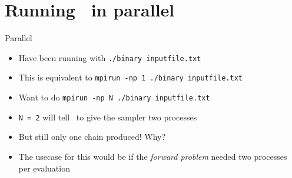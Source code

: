 \section{Running \Queso\ in parallel}
\begin{frame}[fragile]{Parallel \Queso}
  \begin{itemize}
    \item Have been running with \texttt{./binary inputfile.txt}
    \item This is equivalent to \texttt{mpirun -np 1 ./binary inputfile.txt}
    \item Want to do \texttt{mpirun -np N ./binary inputfile.txt}
    \item \texttt{N = 2} will tell \Queso\ to give the sampler two processes
    \item But still only one chain produced!  Why?
    \item The usecase for this would be if the \emph{forward problem} needed
      two processes per evaluation
  \end{itemize}
\end{frame}


